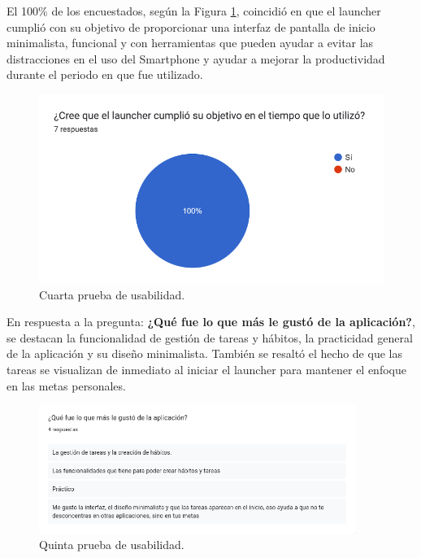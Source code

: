 El 100\% de los encuestados, según la Figura \ref{fig:cumplio_objetivo}, coincidió en que el launcher cumplió con su objetivo de proporcionar una interfaz de pantalla de inicio minimalista, funcional y con herramientas que pueden ayudar a evitar las distracciones en el uso del Smartphone y ayudar a mejorar la productividad durante el periodo en que fue utilizado.

\begin{figure}[h]
  \caption{Cuarta prueba de usabilidad.}
  \label{fig:cumplio_objetivo}
  \includegraphics[width=\textwidth]{Figuras/cumplio_objetivo.png}
  \centering
\end{figure}

En respuesta a la pregunta: \textbf{¿Qué fue lo que más le gustó de la aplicación?}, se destacan la funcionalidad de gestión de tareas y hábitos, la practicidad general de la aplicación y su diseño minimalista. También se resaltó el hecho de que las tareas se visualizan de inmediato al iniciar el launcher para mantener el enfoque en las metas personales.

\begin{figure}[h]
  \caption{Quinta prueba de usabilidad.}
  \label{fig:mas_valorado}
  \includegraphics[width=0.92\textwidth]{Figuras/mas_valorado.png}
  \centering
\end{figure}

